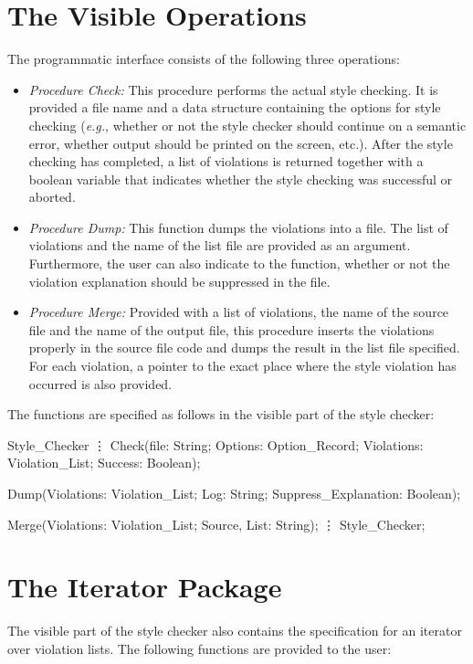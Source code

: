\section{The Visible Operations}
The programmatic interface consists of the following three operations:

\begin{itemize}

\item {\it Procedure Check:} This procedure performs the 
actual style checking. It is provided a file name and
a data structure containing the options for style checking ({\em e.g.},
whether or not the style checker should continue on a semantic error, whether output
should be printed on the screen, etc.). After the style
checking has completed, a list of violations is returned together with
a boolean variable that indicates whether the style checking was successful or
aborted.

\item {\it Procedure Dump:} This function dumps the violations into a
file. The list of violations and the name of the list file are provided
 as an argument.
Furthermore, the user can also indicate to the function, whether or not the
violation explanation should be suppressed in the file.

\item {\it Procedure Merge:} Provided with a list of violations,
the name of the source file and the name of the output file, this
procedure inserts the violations properly in the source
file code and dumps the result in the list file specified. For each violation,
a pointer
to the exact place where the style violation has occurred is also
provided.

\end{itemize}

\noindent
The functions are specified as follows in the visible part of the
style checker:

\apebegin\bhinge
\Package Style_Checker \Is
\vdots
  \Procedure Check(file: String; Options: Option_Record;
                        Violations: \Out Violation_List;
                        Success: \Out Boolean);

  \Procedure Dump(Violations: Violation_List; Log: \In String; 
                       Suppress_Explanation: Boolean);

  \Procedure Merge(Violations: Violation_List; Source, List: String);
\vdots
\End Style_Checker;
\apeend

\section{The Iterator Package}
The visible part of the style checker also contains the specification for
an iterator over violation lists.
The following functions are provided to the user:

